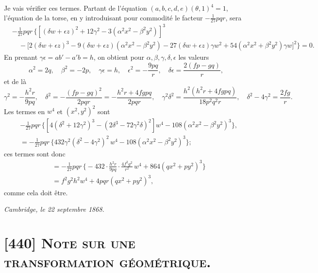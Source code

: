 \documentclass[11pt,a4paper]{article}
\begin{document}
Je vais v\'erifier ces termes. Partant de l'\'equation $(a, b, c, d, e)(\theta, 1)^4 = 1$,
l'\'equation de la torse, en y introduisant pour commodit\'e le facteur $-\tfrac{1}{27} pqr$,
sera
\[
\begin{aligned}
& - \tfrac{1}{27} pqr \, \bigl\{ [(\delta w + \epsilon z)^2 + 12 \gamma^2 - 3 (\alpha^2 x^2 - \beta^2 y^2)]^3 \\
& \quad {} - \bigl[ 2 (\delta w + \epsilon z)^3 - 9 (\delta w + \epsilon z)(\alpha^2 x^2 - \beta^2 y^2)
   - 27 (\delta w + \epsilon z) \gamma w^2 + 54 (\alpha^2 x^2 + \beta^2 y^2) \gamma w \bigr]^2 \bigr\} = 0.
\end{aligned}
\]
En prenant $\gamma \epsilon = ab' - a'b = h$, on obtient pour $\alpha, \beta, \gamma, \delta, \epsilon$
les valeurs
\[
\alpha^2 = 2q,\quad \beta^2 = -2p,\quad \gamma \epsilon = h,\quad \epsilon^2 = -\frac{9pq}{r},\quad
\delta \epsilon = \frac{2 (fp - gq)}{r},
\]
et de l\`a
\[
\gamma^2 = -\frac{h^2 r}{9pq},\quad \delta^2 = -\frac{(fp - gq)^2}{2pqr}
 = -\frac{h^2 r + 4 fgpq}{2pqr},\quad \gamma^2 \delta^2 = \frac{h^2 (h^2 r + 4 fgpq)}{18 p^2 q^2 r},\quad
\delta^2 - 4 \gamma^2 = \frac{2 fg}{r}.
\]
Les termes en $w^4$ et $(x^2, y^2)^2$ sont
\[
\begin{aligned}
& - \tfrac{1}{27} pqr \, \bigl\{ [4 (\delta^2 + 12 \gamma^2)^3 - (2\delta^3 - 72 \gamma^2 \delta)^2] w^4
   - 108 (\alpha^2 x^2 - \beta^2 y^2)^3 \bigr\}, \\
& = -\tfrac{1}{27} pqr \, \bigl\{ 432 \gamma^2 (\delta^2 - 4\gamma^2)^2 \, w^4
   - 108 (\alpha^2 x^2 - \beta^2 y^2)^3 \bigr\};
\end{aligned}
\]
ces termes sont donc
\[
\begin{aligned}
& = -\tfrac{1}{27} pqr \, \biggl\{ -432 \cdot \frac{h^2 r}{9 pq} \cdot \frac{4 f^2 g^2}{r^2} \, w^4
   + 864 (qx^2 + py^2)^3 \biggr\} \\
& = f^2 g^2 h^2 w^4 + 4 pqr (qx^2 + py^2)^3,
\end{aligned}
\]
comme cela doit \^etre.

\begin{flushright}
\textit{Cambridge, le 22 septembre 1868.}
\end{flushright}

\clearpage

\section{[440] \textsc{Note sur une transformation g\'eom\'etrique.}}
\end{document}
